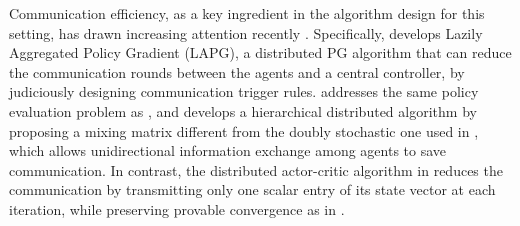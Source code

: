 Communication efficiency, as a key ingredient in the algorithm design for this setting, has drawn increasing attention recently \cite{chen2018communication,ren2019communication,lin2019communication}.  Specifically, \cite{chen2018communication} develops Lazily
Aggregated Policy Gradient (LAPG), a distributed PG algorithm that can reduce  the communication rounds between the agents and a central controller, by judiciously designing communication trigger rules. \cite{ren2019communication} addresses the same policy evaluation problem as \cite{wai2018multi}, and develops a   hierarchical distributed algorithm by proposing a mixing matrix different from the doubly stochastic one used in \cite{zhang2018fully,wai2018multi,lee2018primal}, which allows unidirectional information exchange among agents to save  communication. In contrast, the distributed actor-critic algorithm in  \cite{lin2019communication} reduces the communication by transmitting only   one scalar entry of its state vector at each iteration, while preserving provable  convergence as in \cite{zhang2018fully}. 








